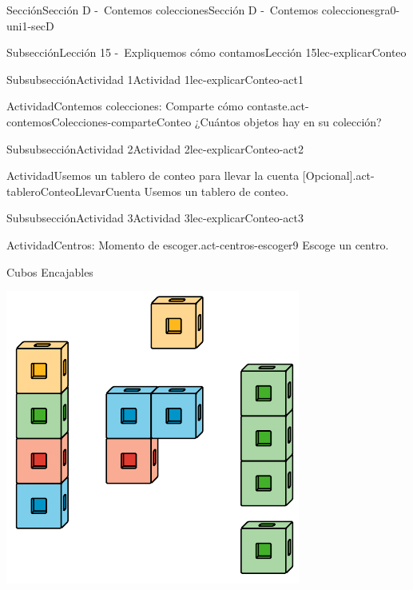 \documentclass[twoside,10pt,]{article}
\begin{document}
\begin{sectionptx}{Sección}{Sección D -~Contemos colecciones}{}{Sección D -~Contemos colecciones}{}{}{gra0-uni1-secD}
\begin{subsectionptx}{Subsección}{Lección 15 -~Expliquemos cómo contamos}{}{Lección 15}{}{}{lec-explicarConteo}
\begin{subsubsectionptx}{Subsubsección}{Actividad 1}{}{Actividad 1}{}{}{lec-explicarConteo-act1}
\begin{activity}{Actividad}{Contemos colecciones: Comparte cómo contaste.}{act-contemosColecciones-comparteConteo}
¿Cuántos objetos hay en su colección?%
\end{activity}%
\end{subsubsectionptx}
%
%
\typeout{************************************************}
\typeout{************************************************}
%
\begin{subsubsectionptx}{Subsubsección}{Actividad 2}{}{Actividad 2}{}{}{lec-explicarConteo-act2}
\begin{activity}{Actividad}{Usemos un tablero de conteo para llevar la cuenta [Opcional].}{act-tableroConteoLlevarCuenta}%
Usemos un tablero de conteo.%
\end{activity}%
\end{subsubsectionptx}
%
%
\typeout{************************************************}
\typeout{************************************************}
%
\begin{subsubsectionptx}{Subsubsección}{Actividad 3}{}{Actividad 3}{}{}{lec-explicarConteo-act3}
\begin{activity}{Actividad}{Centros: Momento de escoger.}{act-centros-escoger9}%
Escoge un centro.%
\begin{sidebyside}{2}{0.025}{0.025}{0.05}%
\begin{sbspanel}{0.45}%
Cubos Encajables%
\par
\includegraphics[width=\linewidth]{external/svg-source/tikz-file-128850.pdf}

\end{sbspanel}
\end{sidebyside}
\end{activity}
\end{subsubsectionptx}
\end{subsectionptx}
\end{sectionptx}
\end{document}
